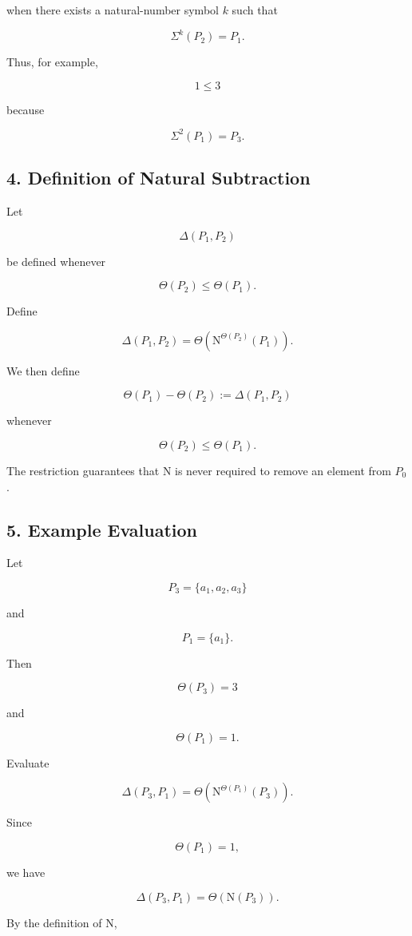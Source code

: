 \documentclass[12pt]{article}
\newcommand{\Nu}{\mathrm{N}}
\begin{document}
when there exists a natural-number symbol \(k\) such that

\[
\Sigma^k(P_2)=P_1.
\]

Thus, for example,

\[
1\leq3
\]

because

\[
\Sigma^2(P_1)=P_3.
\]

\subsection*{4. Definition of Natural Subtraction}

Let

\[
\Delta(P_1,P_2)
\]

be defined whenever

\[
\Theta(P_2)\leq \Theta(P_1).
\]

Define

\[
\boxed{
\Delta(P_1,P_2)
=
\Theta\left(
\Nu^{\Theta(P_2)}(P_1)
\right).
}
\]

We then define

\[
\boxed{
\Theta(P_1)-\Theta(P_2)
:=
\Delta(P_1,P_2)
}
\]

whenever

\[
\Theta(P_2)\leq \Theta(P_1).
\]

The restriction guarantees that \(\Nu\) is never required to remove an element from \(P_0\).

\subsection*{5. Example Evaluation}

Let

\[
P_3=\{a_1,a_2,a_3\}
\]

and

\[
P_1=\{a_1\}.
\]

Then

\[
\Theta(P_3)=3
\]

and

\[
\Theta(P_1)=1.
\]

Evaluate

\[
\Delta(P_3,P_1)
=
\Theta\left(\Nu^{\Theta(P_1)}(P_3)\right).
\]

Since

\[
\Theta(P_1)=1,
\]

we have

\[
\Delta(P_3,P_1)
=
\Theta(\Nu(P_3)).
\]

By the definition of \(\Nu\),
\end{document}
